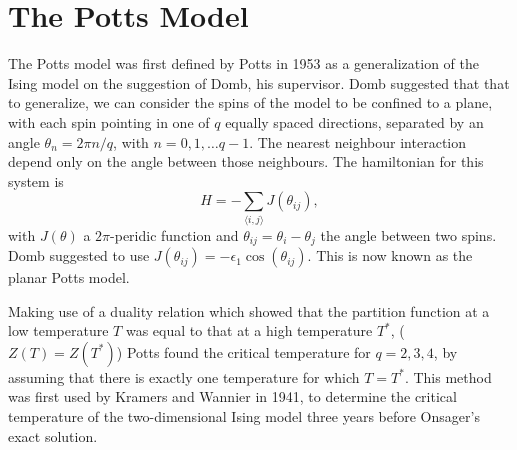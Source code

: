 \documentclass[11pt, a4paper]{report} %
\begin{document}
\section{The Potts Model}
The Potts model was first defined by Potts in 1953 as a generalization of the Ising model on the suggestion of Domb, his supervisor.\cite{potts:1952}
Domb suggested that that to generalize, we can consider the spins of the model to be confined to a plane, with each spin pointing in one of \(q\) equally spaced directions, separated by an angle \(\theta_n = 2\pi n /q\), with \(n = 0, 1, \ldots q - 1\).
The nearest neighbour interaction depend only on the angle between those neighbours.
The hamiltonian for this system is
\begin{equation}
	H = - \sum_{\langle i, j \rangle} J(\theta_{ij}),
\end{equation}
with \(J(\theta)\) a \(2\pi\)-peridic function and \(\theta_{ij} = \theta_i - \theta_j\) the angle between two spins.
Domb suggested to use \(J(\theta_{ij}) = - \epsilon_1\cos(\theta_{ij})\).
This is now known as the planar Potts model.\cite{wu:1982}

Making use of a duality relation which showed that the partition function at a low temperature \(T\) was equal to that at a high temperature \(T^*\), (\(Z(T)=Z(T^*)\)) Potts found the critical temperature for \(q=2, 3, 4\), by assuming that there is exactly one temperature for which \(T=T^*\).
This method was first used by Kramers and Wannier in 1941\cite{kramers:1941}, to determine the critical temperature of the two-dimensional Ising model three years before Onsager's exact solution.
\end{document}
